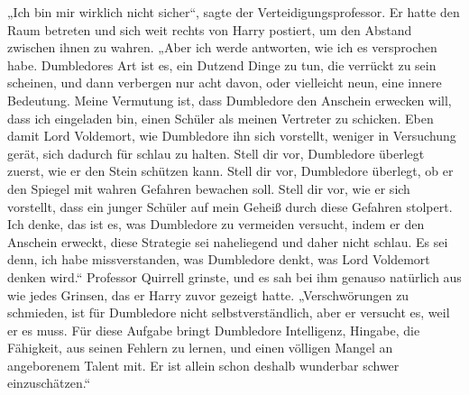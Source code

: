 „Ich bin mir wirklich nicht sicher“, sagte der Verteidigungsprofessor.
Er hatte den Raum betreten und sich weit rechts von Harry postiert, um den Abstand zwischen ihnen zu wahren.
„Aber ich werde antworten, wie ich es versprochen habe. Dumbledores Art ist es, ein Dutzend Dinge zu tun, die verrückt zu sein scheinen, und dann verbergen nur acht davon, oder vielleicht neun, eine innere Bedeutung. Meine Vermutung ist, dass Dumbledore den Anschein erwecken will, dass ich eingeladen bin, einen Schüler als meinen Vertreter zu schicken. Eben damit Lord Voldemort, wie Dumbledore ihn sich vorstellt, weniger in Versuchung gerät, sich dadurch für schlau zu halten. Stell dir vor, Dumbledore überlegt zuerst, wie er den Stein schützen kann. Stell dir vor, Dumbledore überlegt, ob er den Spiegel mit wahren Gefahren bewachen soll. Stell dir vor, wie er sich vorstellt, dass ein junger Schüler auf mein Geheiß durch diese Gefahren stolpert. Ich denke, das ist es, was Dumbledore zu vermeiden versucht, indem er den Anschein erweckt, diese Strategie sei naheliegend und daher nicht schlau. Es sei denn, ich habe missverstanden, was Dumbledore denkt, was Lord Voldemort denken wird.“
Professor Quirrell grinste, und es sah bei ihm genauso natürlich aus wie jedes Grinsen, das er Harry zuvor gezeigt hatte.
„Verschwörungen zu schmieden, ist für Dumbledore nicht selbstverständlich, aber er versucht es, weil er es muss. Für diese Aufgabe bringt Dumbledore Intelligenz, Hingabe, die Fähigkeit, aus seinen Fehlern zu lernen, und einen völligen Mangel an angeborenem Talent mit. Er ist allein schon deshalb wunderbar schwer einzuschätzen.“

